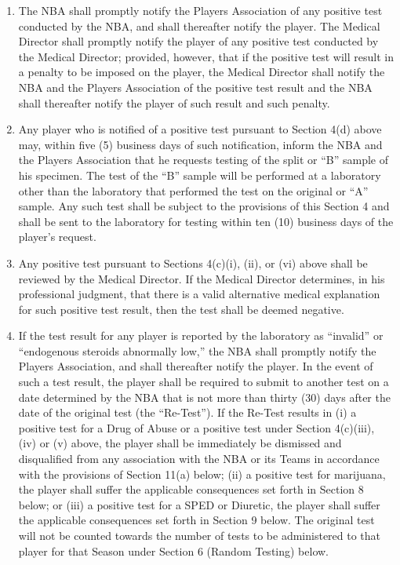 \documentclass[
]{book}
\begin{document}
\begin{enumerate}
\item
  The NBA shall promptly notify the Players Association of any positive test conducted by the NBA, and shall thereafter notify the player. The Medical Director shall promptly notify the player of any positive test conducted by the Medical Director; provided, however, that if the positive test will result in a penalty to be imposed on the player, the Medical Director shall notify the NBA and the Players Association of the positive test result and the NBA shall thereafter notify the player of such result and such penalty.
\item
  Any player who is notified of a positive test pursuant to Section 4(d) above may, within five (5) business days of such notification, inform the NBA and the Players Association that he requests testing of the split or ``B'' sample of his specimen. The test of the ``B'' sample will be performed at a laboratory other than the laboratory that performed the test on the original or ``A'' sample. Any such test shall be subject to the provisions of this Section 4 and shall be sent to the laboratory for testing within ten (10) business days of the player's request.
\item
  Any positive test pursuant to Sections 4(c)(i), (ii), or (vi) above shall be reviewed by the Medical Director. If the Medical Director determines, in his professional judgment, that there is a valid alternative medical explanation for such positive test result, then the test shall be deemed negative.
\item
  If the test result for any player is reported by the laboratory as ``invalid'' or ``endogenous steroids abnormally low,'' the NBA shall promptly notify the Players Association, and shall thereafter notify the player. In the event of such a test result, the player shall be required to submit to another test on a date determined by the NBA that is not more than thirty (30) days after the date of the original test (the ``Re-Test''). If the Re-Test results in (i) a positive test for a Drug of Abuse or a positive test under Section 4(c)(iii), (iv) or (v) above, the player shall be immediately be dismissed and disqualified from any association with the NBA or its Teams in accordance with the provisions of Section 11(a) below; (ii) a positive test for marijuana, the player shall suffer the applicable consequences set forth in Section 8 below; or (iii) a positive test for a SPED or Diuretic, the player shall suffer the applicable consequences set forth in Section 9 below. The original test will not be counted towards the number of tests to be administered to that player for that Season under Section 6 (Random Testing) below.
\end{enumerate}
\end{document}
